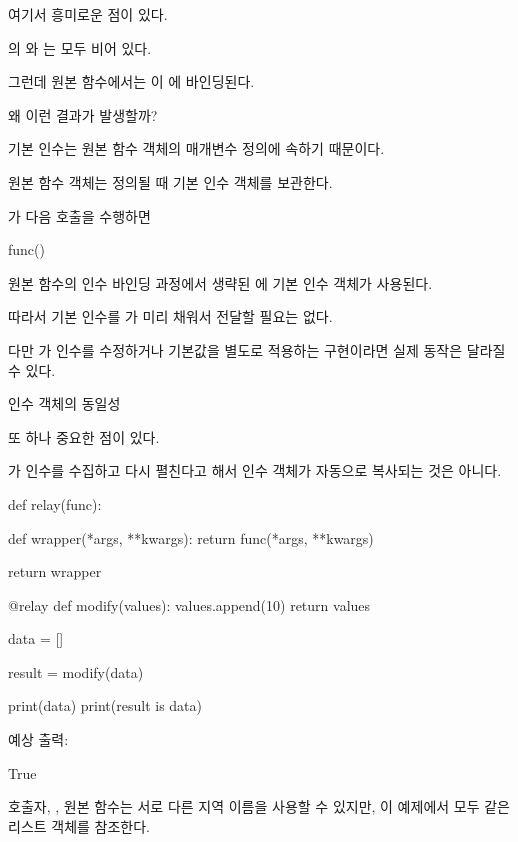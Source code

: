 여기서 흥미로운 점이 있다.

의 와 는 모두 비어 있다.

그런데 원본 함수에서는 이 에 바인딩된다.

왜 이런 결과가 발생할까?

기본 인수는 원본 함수 객체의 매개변수 정의에 속하기 때문이다.

원본  함수 객체는 정의될 때 기본 인수 객체를 보관한다.

가 다음 호출을 수행하면

\begin{dhkcode}
func()
\end{dhkcode}

원본 함수의 인수 바인딩 과정에서 생략된 에 기본 인수 객체가 사용된다.

따라서 기본 인수를 가 미리 채워서 전달할 필요는 없다.

다만 가 인수를 수정하거나 기본값을 별도로 적용하는 구현이라면 실제 동작은 달라질 수 있다.

\begin{dhknote}
\begin{dhksmry}[centered]
인수 객체의 동일성
\end{dhksmry}
\end{dhknote}

또 하나 중요한 점이 있다.

가 인수를 수집하고 다시 펼친다고 해서 인수 객체가 자동으로 복사되는 것은 아니다.

\begin{dhkcode}
def relay(func):

    def wrapper(*args, **kwargs):
        return func(*args, **kwargs)

    return wrapper


@relay
def modify(values):
    values.append(10)
    return values


data = []

result = modify(data)

print(data)
print(result is data)
\end{dhkcode}

예상 출력:

\begin{dhkzsh}
[10]
True
\end{dhkzsh}

호출자, , 원본 함수는 서로 다른 지역 이름을 사용할 수 있지만, 이 예제에서 모두 같은 리스트 객체를 참조한다.

